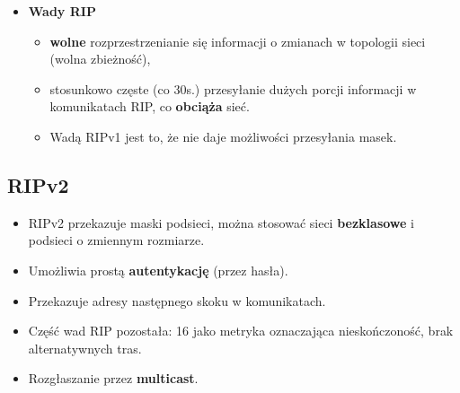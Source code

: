 \documentclass[../main.tex]{subfiles}
\begin{document}
\begin{itemize}
        \item \textbf{Wady RIP}
        \begin{itemize}
            \item \textbf{wolne} rozprzestrzenianie się informacji o zmianach w topologii sieci (wolna zbieżność),
            \item stosunkowo częste (co 30s.) przesyłanie dużych porcji informacji w komunikatach RIP, co \textbf{obciąża} sieć.
            \item Wadą RIPv1 jest to, że nie daje możliwości przesyłania masek.
        \end{itemize}
    \end{itemize}

    \subsection{RIPv2}
    \begin{itemize}
        \item RIPv2 przekazuje maski podsieci, można stosować sieci \textbf{bezklasowe} i podsieci o zmiennym rozmiarze.
        \item Umożliwia prostą \textbf{autentykację} (przez hasła).
        \item Przekazuje adresy następnego skoku w komunikatach.
        \item Część wad RIP pozostała: 16 jako metryka oznaczająca nieskończoność, brak alternatywnych tras.
        \item Rozgłaszanie przez \textbf{multicast}.
    \end{itemize}
\end{document}
